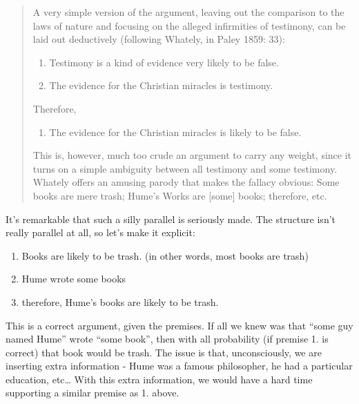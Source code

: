 \begin{quote}
A very simple version of the argument, leaving out the comparison to the
laws of nature and focusing on the alleged infirmities of testimony, can
be laid out deductively (following Whately, in Paley 1859: 33):

\begin{enumerate}
\def\labelenumi{\arabic{enumi})}
\item
  Testimony is a kind of evidence very likely to be false.
\item
  The evidence for the Christian miracles is testimony.
\end{enumerate}

Therefore,

\begin{enumerate}
\def\labelenumi{\arabic{enumi})}
\setcounter{enumi}{2}
\itemsep1pt\parskip0pt
\item
  The evidence for the Christian miracles is likely to be false.
\end{enumerate}

This is, however, much too crude an argument to carry any weight, since
it turns on a simple ambiguity between all testimony and some testimony.
Whately offers an amusing parody that makes the fallacy obvious: Some
books are mere trash; Hume's Works are {[}some{]} books; therefore, etc.
\end{quote}

It's remarkable that such a silly parallel is seriously made. The
structure isn't really parallel at all, so let's make it explicit:

\begin{enumerate}
\def\labelenumi{\arabic{enumi}.}
\itemsep1pt\parskip0pt
\item
  Books are likely to be trash. (in other words, most books are trash)
\item
  Hume wrote some books
\item
  therefore, Hume's books are likely to be trash.
\end{enumerate}

This is a correct argument, given the premises. If all we knew was that
``some guy named Hume'' wrote ``some book'', then with all probability
(if premise 1. is correct) that book would be trash. The issue is that,
unconsciously, we are inserting extra information - Hume was a famous
philosopher, he had a particular education, etc\ldots{} With this extra
information, we would have a hard time supporting a similar premise as
1. above.


